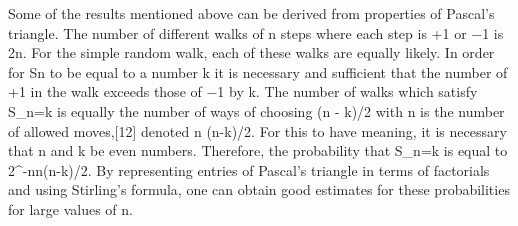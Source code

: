 Some of the results mentioned above can be derived from properties of Pascal's triangle. The number of different walks of n steps where each step is +1 or −1 is 2n. For the simple random walk, each of these walks are equally likely. In order for Sn to be equal to a number k it is necessary and sufficient that the number of +1 in the walk exceeds those of −1 by k. The number of walks which satisfy S_n=k is equally the number of ways of choosing (n - k)/2 with n is the number of allowed moves,[12] denoted n \choose (n-k)/2. For this to have meaning, it is necessary that n and k be even numbers. Therefore, the probability that S_n=k is equal to 2^{-n}{n\choose (n-k)/2}. By representing entries of Pascal's triangle in terms of factorials and using Stirling's formula, one can obtain good estimates for these probabilities for large values of n.
